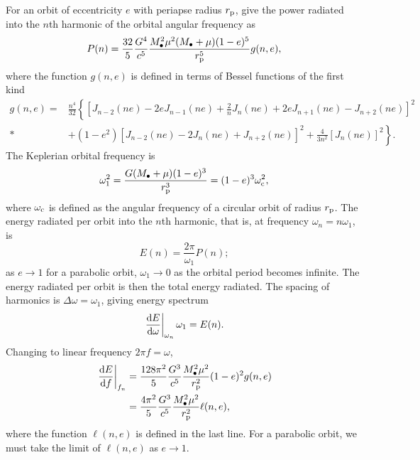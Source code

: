 For an orbit of eccentricity $e$ with periapse radius $r_\mathrm{p}$, \citet{Peters1963} give the power radiated into the $n$th harmonic of the orbital angular frequency as
\begin{equation}
P(n) = \frac{32}{5}\frac{G^4}{c^5}\frac{M_\bullet^2\mu^2(M_\bullet + \mu)(1-e)^5}{r_\mathrm{p}^5}g(n,e),
\label{eq:PM_P}
\end{equation}
where the function $g(n,e)$ is defined in terms of Bessel functions of the first kind
\begin{align}
g(n,e) = {} & \frac{n^4}{32}\left\{\left[J_{n-2}(ne) - 2eJ_{n-1}(ne) + \frac{2}{n}J_n(ne) + 2eJ_{n+1}(ne) - J_{n+2}(ne)\right]^2 \right. \nonumber \\*
 & + \left. \left(1 - e^2\right)\left[J_{n-2}(ne) - 2J_n(ne) + J_{n+2}(ne)\right]^2 + \frac{4}{3n^2}\left[J_n(ne)\right]^2\right\}.
\end{align}
The Keplerian orbital frequency is
\begin{equation}
\omega_1^2 = \frac{G(M_\bullet + \mu)(1 - e)^3}{r_\mathrm{p}^3} = (1 - e)^3\omega_\mathrm{c}^2,
\label{eq:Kepler_freq}
\end{equation}
where $\omega_\mathrm{c}$ is defined as the angular frequency of a circular orbit of radius $r_\mathrm{p}$. The energy radiated per orbit into the $n$th harmonic, that is, at frequency $\omega_n = n\omega_1$, is
\begin{equation}
E(n) = \frac{2\pi}{\omega_1}P(n);
\label{eq:E(n)}
\end{equation}
as $e \rightarrow 1$ for a parabolic orbit, $\omega_1 \rightarrow 0$ as the orbital period becomes infinite. The energy radiated per orbit is then the total energy radiated. The spacing of harmonics is $\Delta\omega = \omega_1$, giving energy spectrum
\begin{equation}
\left.\frac{\mathrm{d} {E}}{\mathrm{d} {\omega}}\right|_{\omega_n}\omega_1 = E(n).
\end{equation}
Changing to linear frequency $2\pi f = \omega$,
\begin{align}
\left.\frac{\mathrm{d} {E}}{\mathrm{d} {f}}\right|_{f_n}  = {} & \frac{128\pi^2}{5}\frac{G^3}{c^5}\frac{M_\bullet^2\mu^2}{r_\mathrm{p}^2}(1-e)^2g(n,e) \\*
  = {} & \frac{4\pi^2}{5}\frac{G^3}{c^5}\frac{M_\bullet^2\mu^2}{r_\mathrm{p}^2}\ell(n,e),
\label{eq:PM_spectrum}
\end{align}
where the function $\ell(n,e)$ is defined in the last line. For a parabolic orbit, we must take the limit of $\ell(n,e)$ as $e \rightarrow 1$.

